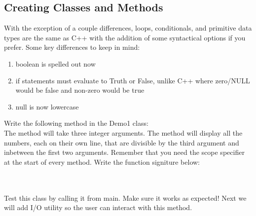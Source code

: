 \documentclass{article}
\begin{document}
\subsection{Creating Classes and Methods}
   \begin{steps}
      \item With the exception of a couple differences, loops, conditionals, and primitive
         data types are the same as C++ with the addition of some syntactical options if
         you prefer. Some key differences to keep in mind:
   \begin{enumerate}[label=\Alph*.]
      \item boolean is spelled out now
      \item if statements must evaluate to Truth or False, unlike C++ where zero/NULL
         would be false and non-zero would be true
      \item null is now lowercase
   \end{enumerate}
   \item Write the following method in the Demo1 class: \\
      The method will take three integer arguments. The method will display all the numbers,
      each on their own line, that are divisible by the third argument and inbetween the first
      two arguments. Remember that you need the scope specifier at the start of every method.
      Write the function signiture below: \\
      \vspace{1cm}\\
      \underline{\hspace{15cm}}\\
      \item Test this class by calling it from main. Make sure it works as expected!
         Next we will add I/O utility so the user can interact with this method.

\end{steps}
\end{document}
